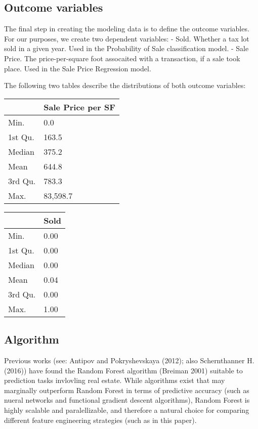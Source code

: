 \documentclass[]{article}
\begin{document}
\subsection{Outcome variables}\label{outcome-variables}

The final step in creating the modeling data is to define the outcome
variables. For our purposes, we create two dependent variables: - Sold.
Whether a tax lot sold in a given year. Used in the Probability of Sale
classification model. - Sale Price. The price-per-square foot assocaited
with a transaction, if a sale took place. Used in the Sale Price
Regression model.

The following two tables describe the distributions of both outcome
variables:

\begin{longtable}[]{@{}ll@{}}
\toprule
& Sale Price per SF\tabularnewline
\midrule
\endhead
Min. & 0.0\tabularnewline
1st Qu. & 163.5\tabularnewline
Median & 375.2\tabularnewline
Mean & 644.8\tabularnewline
3rd Qu. & 783.3\tabularnewline
Max. & 83,598.7\tabularnewline
\bottomrule
\end{longtable}

\begin{longtable}[]{@{}ll@{}}
\toprule
& Sold\tabularnewline
\midrule
\endhead
Min. & 0.00\tabularnewline
1st Qu. & 0.00\tabularnewline
Median & 0.00\tabularnewline
Mean & 0.04\tabularnewline
3rd Qu. & 0.00\tabularnewline
Max. & 1.00\tabularnewline
\bottomrule
\end{longtable}

\subsection{Algorithm}\label{algorithm}

Previous works (see: Antipov and Pokryshevskaya (2012); also
Schernthanner H. (2016)) have found the Random Forest algorithm (Breiman
2001) suitable to prediction tasks invlovling real estate. While
algorithms exist that may marginally outperform Random Forest in terms
of predictive accuracy (such as nueral networks and functional gradient
descent algorithms), Random Forest is highly scalable and
paralellizable, and therefore a natural choice for comparing different
feature engineering strategies (such as in this paper).
\end{document}
